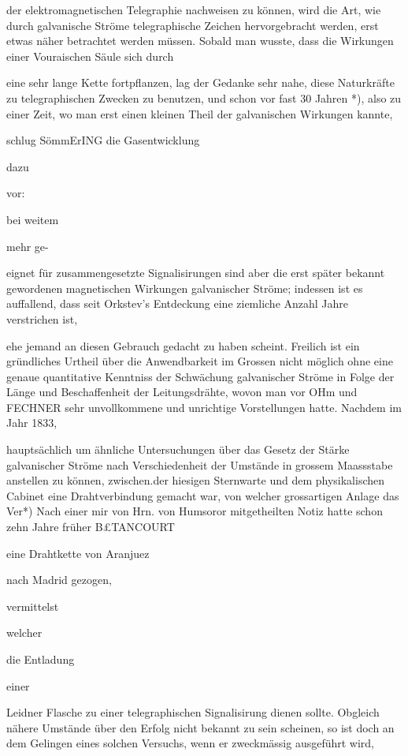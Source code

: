 \documentclass[12pt,a4paper]{article}
\begin{document}
der elektromagnetischen Telegraphie nachweisen zu können, wird die Art, wie durch galvanische Ströme telegraphische Zeichen hervorgebracht werden, erst etwas näher betrachtet werden müssen. Sobald man wusste, dass die Wirkungen einer Vouraischen Säule sich durch

eine sehr lange Kette fortpflanzen, lag der Gedanke sehr nahe, diese Naturkräfte zu telegraphischen Zwecken zu benutzen, und schon vor fast 30 Jahren *), also zu einer Zeit, wo man erst einen kleinen Theil der galvanischen Wirkungen kannte,

schlug SömmErING die Gasentwicklung

dazu

vor:

bei weitem

mehr ge-

eignet für zusammengesetzte Signalisirungen sind aber die erst später bekannt gewordenen magnetischen Wirkungen galvanischer Ströme; indessen ist es auffallend, dass seit Orkstev’s Entdeckung eine ziemliche Anzahl Jahre verstrichen ist,

ehe jemand an diesen Gebrauch gedacht zu haben scheint. Freilich ist ein gründliches Urtheil über die Anwendbarkeit im Grossen nicht möglich ohne eine genaue quantitative Kenntniss der Schwächung galvanischer Ströme in Folge der Länge und Beschaffenheit der Leitungsdrähte, wovon man vor OHm und FECHNER sehr unvollkommene und unrichtige Vorstellungen hatte. Nachdem im Jahr 1833,

hauptsächlich um ähnliche Untersuchungen über das Gesetz der Stärke galvanischer Ströme nach Verschiedenheit der Umstände in grossem Maassstabe anstellen zu können, zwischen.der hiesigen Sternwarte und dem physikalischen Cabinet eine Drahtverbindung gemacht war, von welcher grossartigen Anlage das Ver*) Nach einer mir von Hrn. von Humsoror mitgetheilten Notiz hatte schon zehn Jahre früher B£TANCOURT

eine Drahtkette von Aranjuez

nach Madrid gezogen,

vermittelst

welcher

die Entladung

einer

Leidner Flasche zu einer telegraphischen Signalisirung dienen sollte. Obgleich nähere Umstände über den Erfolg nicht bekannt zu sein scheinen, so ist doch an dem Gelingen eines solchen Versuchs, wenn er zweckmässig ausgeführt wird,
\end{document}
